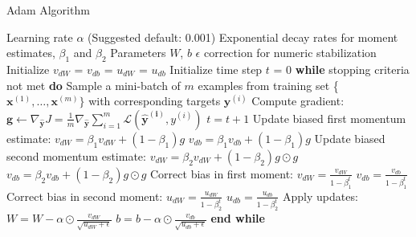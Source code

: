 \begin{algorithm}[!htbp]
	\caption{Adam Algorithm}
	\begin{algorithmic}
		\REQUIRE Learning rate $\alpha$ (Suggested default: 0.001)
		\REQUIRE Exponential decay rates for moment estimates, $\beta_{1}$ and $\beta_{2}$
		\REQUIRE Parameters $W$, $b$
		\REQUIRE $\epsilon$ correction for numeric stabilization 
		\STATE Initialize $v_{dW}$ = $v_{db}$ = $u_{dW}$ = $u_{db}$
		\STATE Initialize time step $t$ = 0
		\STATE \textbf{while} stopping criteria not met \textbf{do}
		\STATE \hspace{5mm} Sample a mini-batch of $m$ examples from training set \{$\boldsymbol{x}^{(1)}, \dots, \boldsymbol{x}^{(m)} \}$ with corresponding targets $\boldsymbol{y}^{(i)}$
		\STATE \hspace{5mm} Compute gradient: 
		$\boldsymbol{g} \leftarrow \nabla_{\boldsymbol{\hat{y}}}J = \frac{1}{m} \nabla_{\boldsymbol{\hat{y}}}\sum_{i = 1}^{m}\mathcal{L}(\boldsymbol{\hat{y}^{(i)}},y^{(i)})$
		\STATE \hspace{5mm} $t = t + 1$
		\STATE \hspace{5mm} Update biased first momentum estimate: 
		\STATE \hspace{10mm} $v_{dW} = \beta_{1} v_{dW} + (1-\beta_{1}) g$ 
		\STATE \hspace{10mm} $v_{db} = \beta_{1} v_{db} + (1-\beta_{1}) g$
		\STATE \hspace{5mm} Update biased second momentum estimate:
		\STATE \hspace{10mm} $v_{dW} = \beta_{2} v_{dW} + (1-\beta_{2}) g \odot g$
		\STATE \hspace{10mm} $v_{db} = \beta_{2} v_{db} + (1-\beta_{2}) g \odot g$
		\STATE \hspace{5mm} Correct bias in first moment:
		\STATE \hspace{10mm} $v_{dW} = \frac{v_{dW}}{1-\beta_{1}^{t}} $
		\STATE \hspace{10mm} $v_{db} = \frac{v_{db}}{1-\beta_{1}^{t}} $
		\STATE \hspace{5mm} Correct bias in second moment:
		\STATE \hspace{10mm} $u_{dW} = \frac{u_{dW}}{1-\beta_{2}^{t}} $
		\STATE \hspace{10mm} $u_{db} = \frac{u_{db}}{1-\beta_{2}^{t}} $
		\STATE \hspace{5mm} Apply updates:
		\STATE \hspace{10mm} $W = W - \alpha \odot \frac{v_{dW}}{\sqrt{u_{dW} + \epsilon}}$ 
		\STATE \hspace{10mm} $b = b - \alpha \odot \frac{v_{db}}{\sqrt{u_{db} + \epsilon}}$ 
		\STATE \textbf{end while}
	\end{algorithmic}
	\label{alg:adam}
\end{algorithm}

